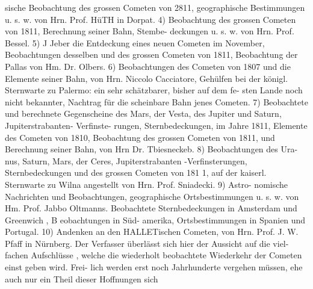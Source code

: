 \documentclass[12pt,a4paper]{article}
\begin{document}
sische Beobachtung des grossen Cometen von 2811, geographische Bestimmungen u. s. w. von Hrn. Prof.\newline
HüTH in Dorpat. 4) Beobachtung des grossen Cometen von 1811, Berechnung seiner Bahn, Stembe-\newline
deckungen u. s. w. von Hrn. Prof. Bessel. 5) J Jeber die Entdeckung eines neuen Cometen im November, Beobachtungen desselben und des grossen Cometen von 1811, Beobachtung der Pallas von Hm.\newline
Dr. Olbers. 6) Beobachtungen des Cometen von 1807 und die Elemente seiner Bahn, von Hrn. Niccolo\newline
Cacciatore, Gehülfen bei der königl. Sternwarte zu Palermo: ein sehr schätzbarer, bisher auf dem fe-\newline
sten Lande noch nicht bekannter, Nachtrag für die scheinbare Bahn jenes Cometen. 7) Beobachtete\newline
und berechnete Gegenscheine des Mars, der Vesta, des Jupiter und Saturn, Jupiterstrabanten- Verfinste-\newline
rungen, Sternbedeckungen, im Jahre 1811, Elemente des Cometen von 1810, Beobachtung des grossen\newline
Cometen von 1811, und Berechnung seiner Bahn, von Hrn Dr. Tbiesneckeb. 8) Beobachtungen des Ura-\newline
nus, Saturn, Mars, der Ceres, Jupiterstrabanten -Verfinsterungen, Sternbedeckungen und des grossen\newline
Cometen von 181 1, auf der kaiserl. Sternwarte zu Wilna angestellt von Hrn. Prof. Sniadecki. 9) Astro-\newline
nomische Nachrichten und Beobachtungen, geographische Ortsbestimmungen u. s. w. von Hm. Prof.\newline
Jabbo Oltmanns. Beobachtete Sternbedeckungen in Amsterdam und Greenwich , B eobachtungen in Süd-\newline
amerika, Ortsbestimmungen in Spanien und Portugal. 10) Andenken an den HALLETischen Cometen,\newline
von Hrn. Prof. J. W. Pfaff in Nürnberg. Der Verfasser überlässt sich hier der Aussicht auf die viel-\newline
fachen Aufschlüsse , welche die wiederholt beobachtete Wiederkehr der Cometen einst geben wird. Frei-\newline
lich werden erst noch Jahrhunderte vergehen müssen, ehe auch nur ein Theil dieser Hoffnungen sich\newline
\end{document}
